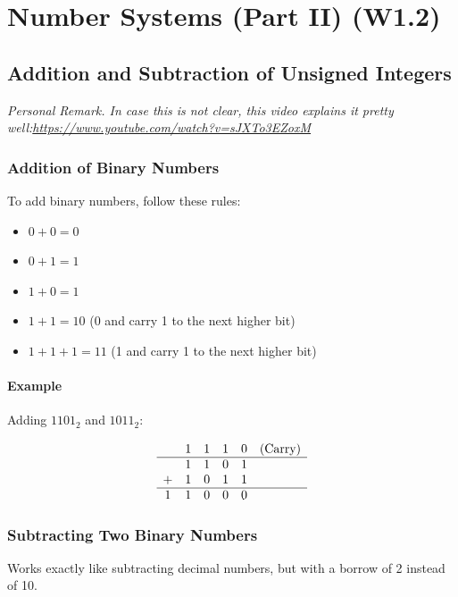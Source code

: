 \documentclass[12pt,openany]{book}
\begin{document}
	
	\chapter{Number Systems (Part II) (W1.2)}
	
	\section{Addition and Subtraction
	of Unsigned Integers}
	\textit{Personal Remark. In case this is not clear, this video explains it pretty well:\newline \url{https://www.youtube.com/watch?v=sJXTo3EZoxM}}
	\subsection{Addition of Binary Numbers}
	
	To add binary numbers, follow these rules:
	\begin{itemize}
		\item[] \(0 + 0 = 0\)
		\item[] \(0 + 1 = 1\)
		\item[] \(1 + 0 = 1\)
		\item[] \(1 + 1 = 10\) (0 and carry 1 to the next higher bit)
		\item[] \(1 + 1 + 1 = 11\) (1 and carry 1 to the next higher bit)
	\end{itemize}
	
	\subsubsection{Example}
	
	Adding \(1101_2\) and \(1011_2\):
	
	\[
		\begin{array}{cccccc}
			  & 1 & 1 & 1 & 0 & \text{(Carry)} \\
			\hline
			  & 1 & 1 & 0 & 1 &                \\
			+ & 1 & 0 & 1 & 1 &                \\
			\hline
			1 & 1 & 0 & 0 & 0 &                \\
		\end{array}
	\]
	
	
	\subsection{Subtracting Two Binary Numbers}
	Works exactly like subtracting decimal numbers, but with a borrow of 2 instead of 10.
	
\end{document}
